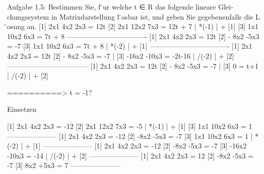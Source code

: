 Aufgabe 1.5: Bestimmen Sie, f ̈ur welche t ∈ R das folgende lineare Glei-
chungssystem in Matrixdarstellung l ̈osbar ist, und geben Sie gegebenenfalls
die L ̈osung an.
[1] 2x1  4x2 2x3 = 12t
[2] 2x1 12x2 7x3 = 12t + 7 | *(-1) | + [1]
[3] 1x1 10x2 6x3 = 7t + 8
----------------------------------
[1] 2x1  4x2 2x3 = 12t
[2]    - 8x2 -5x3 = -7
[3] 1x1 10x2 6x3 = 7t + 8 | *(-2) | + [1]
----------------------------------
[1] 2x1  4x2 2x3 = 12t
[2]    - 8x2 -5x3 = -7        |
[3]    -16x2 -10x3 = -2t-16   | /(-2) | + [2]
-----------------------------------
[1] 2x1  4x2 2x3 = 12t
[2]    - 8x2 -5x3 = -7        |
[3]    0 = t+1   | /(-2) | + [2]


==========> t = -1?

Einsetzen

[1] 2x1  4x2 2x3 = -12
[2] 2x1 12x2 7x3 = -5  | *(-1) | + [1]
[3] 1x1 10x2 6x3 = 1
---------------------
[1] 2x1  4x2 2x3 = -12
[2]     -8x2 -5x3 = -7
[3] 1x1 10x2 6x3 = 1 | *(-2) | + [1]
---------------------
[1] 2x1  4x2 2x3 = -12
[2]     -8x2 -5x3 = -7
[3]   -16x2 -10x3 = -14 | /(-2) | + [2]
---------------------
[1] 2x1  4x2 2x3 = 12
[2]     -8x2 -5x3 = -7
[3]      8x2 +5x3 = 7
---------------------





